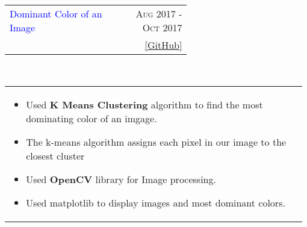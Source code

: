 \documentclass[a4paper]{article} %
\newcommand{\verticalspacing}{-0.25cm}
\newcommand{\bulletspace}{0.7cm}
\newcommand{\projectheadspacing}{6.9cm}
\newcommand{\cproject}[5]{%
    \begin{tabular}{p{0.60\linewidth}r}
        \textcolor{blue}{\small #2} & \multicolumn{1}{m{ \projectheadspacing{} }}{\raggedleft \small {\textsc{#1}}}\\
        \small {#3} & \small {#4}
    \end{tabular}\\
    \begin{tabular}{p{0.98\linewidth}}
    \vspace{-0.3cm}
        \small{#5}
    \end{tabular}
    \vspace{\verticalspacing{}}
}
\begin{document}
\cproject
    {Aug 2017 - Oct 2017}
    {Dominant Color of an Image}
    {\textsc{\raggedright Image Processing, Coursera}}
    {\href{https://github.com/er-ashish01/Digit-Recognition} {[GitHub]}}
    {%
        \begin{itemize}[leftmargin=\bulletspace{}]
            \item Used \textbf{K Means Clustering} algorithm to find the most dominating color of an imgage.
            \item The k-means algorithm assigns each pixel in our image to the closest cluster
            \item Used \textbf{OpenCV} library for Image processing.
            \item Used matplotlib to display images and most dominant colors.
        \end{itemize}
    }


\end{document}
